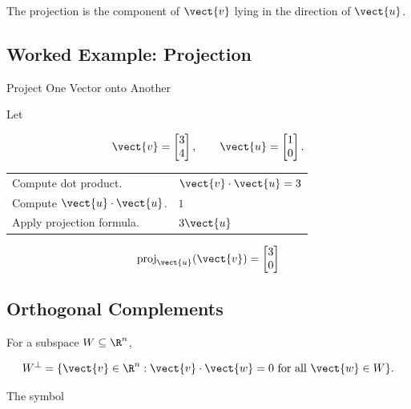 The projection is the component of \(\vect{v}\) lying in the direction of
\(\vect{u}\).

\subsection{Worked Example: Projection}
\label{subsec:worked-vector-projection}

\begin{workedexamplebox}{Project One Vector onto Another}

Let

\[ \vect{v}=\begin{bmatrix}3\\4\end{bmatrix},\qquad
\vect{u}=\begin{bmatrix}1\\0\end{bmatrix}. \]

\begin{tabularx}{\textwidth}{@{}>{\raggedright\arraybackslash}p{}X@{}}
Compute dot product. & \(\vect{v}\cdot\vect{u}=3\)\\
Compute \(\vect{u}\cdot\vect{u}\). & \(1\)\\
Apply projection formula. & \(3\vect{u}\)
\end{tabularx}

\begin{answerbox}
\[ \operatorname{proj}_{\vect{u}}(\vect{v})
=\begin{bmatrix}3\\0\end{bmatrix} \]
\end{answerbox}
\end{workedexamplebox}

\subsection{Orthogonal Complements}
\label{subsec:orthogonal-complements}

For a subspace \(W\subseteq\R^n\),

\[ W^\perp=
\{\vect{v}\in\R^n:\vect{v}\cdot\vect{w}=0
\text{ for all }\vect{w}\in W\}. \]

The symbol


